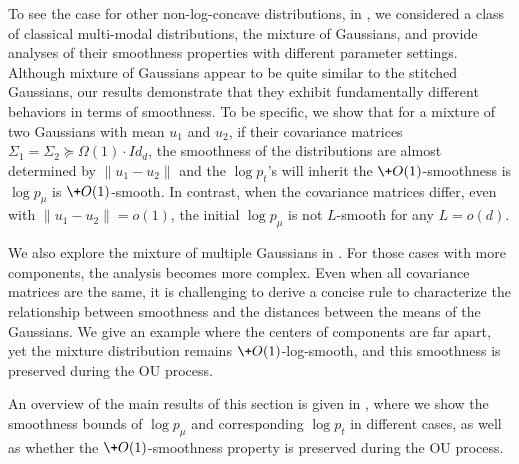 To see the case for other non-log-concave distributions, in , we considered a class of classical multi-modal distributions, the mixture of Gaussians, and provide analyses of their smoothness properties with different parameter settings. Although mixture of Gaussians appear to be quite similar to the stitched Gaussians, our results demonstrate that they exhibit fundamentally different behaviors in terms of smoothness. To be specific, we show that for a mixture of two Gaussians with mean $u_1$ and $u_2$, if their covariance matrices $\Sigma_1=\Sigma_2\succeq \Omega(1)\cdot \!{Id}_d$, the smoothness of the distributions are almost determined by $\|u_1-u_2\|$ and the $\log p_t$'s will inherit the $\+O(1)$-smoothness is $\log p_{\mu}$ is $\+O(1)$-smooth. In contrast, when the covariance matrices differ, even with $\|u_1-u_2\|=o(1)$, the initial $\log p_{\mu}$ is not $L$-smooth for any $L=o(d)$. 

We also explore the mixture of multiple Gaussians in . For those cases with more components, the analysis becomes more complex. Even when all covariance matrices are the same, it is challenging to derive a concise rule to characterize the relationship between smoothness and the distances between the means of the Gaussians. We give an example where the centers of components are far apart, yet the mixture distribution remains $\+O(1)$-log-smooth, and this smoothness is preserved during the OU process.

An overview of the main results of this section is given in , where we show the smoothness bounds of $\log p_{\mu}$ and corresponding $\log p_t$ in different cases, as well as whether the $\+O(1)$-smoothness property is preserved during the OU process.

